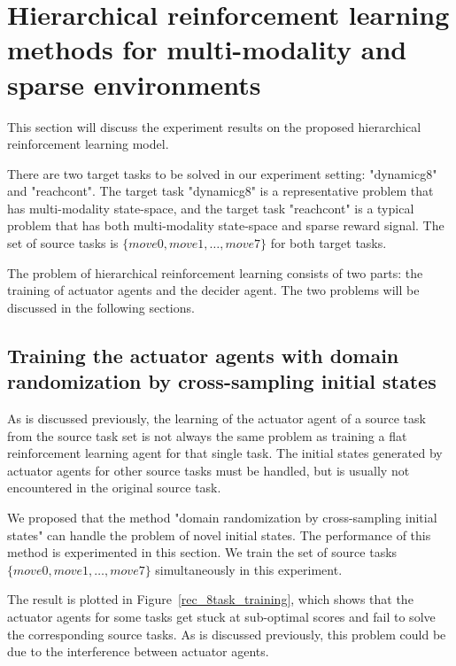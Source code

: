 
\section{Hierarchical reinforcement learning methods for multi-modality and sparse environments}
This section will discuss the experiment results on the proposed hierarchical reinforcement learning model.

There are two target tasks to be solved in our experiment setting: "dynamicg8" and "reachcont". The target task "dynamicg8" is a representative problem that has multi-modality state-space, and the target task "reachcont" is a typical problem that has both multi-modality state-space and sparse reward signal. The set of source tasks is  $\{move0, move1, \dots, move7 \}$ for both target tasks.

The problem of hierarchical reinforcement learning consists of two parts: the training of actuator agents and the decider agent. The two problems will be discussed in the following sections.


\subsection{Training the actuator agents with domain randomization by cross-sampling initial states}
As is discussed previously, the learning of the actuator agent of a source task from the source task set is not always the same problem as training a flat reinforcement learning agent for that single task. The initial states generated by actuator agents for other source tasks must be handled, but is usually not encountered in the original source task.

We proposed that the method "domain randomization by cross-sampling initial states" can handle the problem of novel initial states. The performance of this method is experimented in this section. We train the set of source tasks $\{move0, move1, \dots, move7 \}$ simultaneously in this experiment.  

The result is plotted in Figure~\ref{rec_8task_training}, which shows that the actuator agents for some tasks get stuck at sub-optimal scores and fail to solve the corresponding source tasks. As is discussed previously, this problem could be due to the interference between actuator agents.

